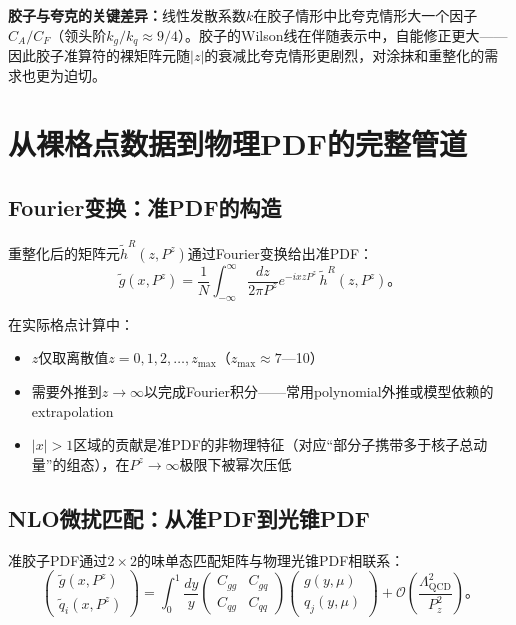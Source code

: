 \documentclass[12pt,a4paper]{ctexart}
\theoremstyle{definition}
\begin{document}
\textbf{胶子与夸克的关键差异：}\cite{Chen2025gluon}线性发散系数$k$在胶子情形中比夸克情形大一个因子$C_A/C_F$（领头阶$k_g/k_q \approx 9/4$）。胶子的Wilson线在伴随表示中，自能修正更大——因此胶子准算符的裸矩阵元随$|z|$的衰减比夸克情形更剧烈，对涂抹和重整化的需求也更为迫切。

\section{从裸格点数据到物理PDF的完整管道}

\subsection{Fourier变换：准PDF的构造}

重整化后的矩阵元$\tilde{h}^R(z, P^z)$通过Fourier变换给出准PDF\cite{Ji2013,Zhang2019}：
\begin{equation}
\boxed{\tilde{g}(x, P^z) = \frac{1}{N} \int_{-\infty}^{\infty} \frac{dz}{2\pi P^z} e^{-ixzP^z} \, \tilde{h}^R(z, P^z)}。
\label{eq:quasi_pdf_fourier}
\end{equation}

在实际格点计算中\cite{Chen2025gluon,代码解析}：
\begin{itemize}
    \item $z$仅取离散值$z=0,1,2,\ldots,z_{\max}$（$z_{\max}\approx7$—10）
    \item 需要外推到$z\to\infty$以完成Fourier积分——常用polynomial外推或模型依赖的extrapolation
    \item $|x|>1$区域的贡献是准PDF的非物理特征（对应``部分子携带多于核子总动量''的组态），在$P^z\to\infty$极限下被幂次压低
\end{itemize}

\subsection{NLO微扰匹配：从准PDF到光锥PDF}

准胶子PDF通过$2\times2$的味单态匹配矩阵与物理光锥PDF相联系\cite{Zhang2019,Yao2023}：
\begin{equation}
\boxed{\begin{pmatrix} \tilde{g}(x, P^z) \\ \tilde{q}_i(x, P^z) \end{pmatrix} =
\int_0^1 \frac{dy}{y}
\begin{pmatrix} C_{gg} & C_{gq} \\ C_{qg} & C_{qq} \end{pmatrix}
\begin{pmatrix} g(y, \mu) \\ q_j(y, \mu) \end{pmatrix} + \mathcal{O}\left(\frac{\Lambda^2_{\text{QCD}}}{P_z^2}\right)}。
\label{eq:2x2_matching}
\end{equation}
\end{document}
